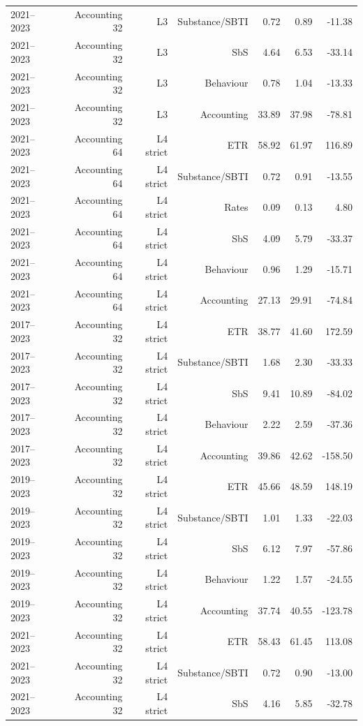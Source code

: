 {\begin{longtable}{@{}lrrrrrr@{}}
2021–2023 & Accounting 32 & L3 & Substance/SBTI &  0.72 &  0.89 &  -11.38 \\
2021–2023 & Accounting 32 & L3 & SbS &  4.64 &  6.53 &  -33.14 \\
2021–2023 & Accounting 32 & L3 & Behaviour &  0.78 &  1.04 &  -13.33 \\
2021–2023 & Accounting 32 & L3 & Accounting & 33.89 & 37.98 &  -78.81 \\
2021–2023 & Accounting 64 & L4 strict & ETR & 58.92 & 61.97 &  116.89 \\
2021–2023 & Accounting 64 & L4 strict & Substance/SBTI &  0.72 &  0.91 &  -13.55 \\
2021–2023 & Accounting 64 & L4 strict & Rates &  0.09 &  0.13 &    4.80 \\
2021–2023 & Accounting 64 & L4 strict & SbS &  4.09 &  5.79 &  -33.37 \\
2021–2023 & Accounting 64 & L4 strict & Behaviour &  0.96 &  1.29 &  -15.71 \\
2021–2023 & Accounting 64 & L4 strict & Accounting & 27.13 & 29.91 &  -74.84 \\
2017–2023 & Accounting 32 & L4 strict & ETR & 38.77 & 41.60 &  172.59 \\
2017–2023 & Accounting 32 & L4 strict & Substance/SBTI &  1.68 &  2.30 &  -33.33 \\
2017–2023 & Accounting 32 & L4 strict & SbS &  9.41 & 10.89 &  -84.02 \\
2017–2023 & Accounting 32 & L4 strict & Behaviour &  2.22 &  2.59 &  -37.36 \\
2017–2023 & Accounting 32 & L4 strict & Accounting & 39.86 & 42.62 & -158.50 \\
2019–2023 & Accounting 32 & L4 strict & ETR & 45.66 & 48.59 &  148.19 \\
2019–2023 & Accounting 32 & L4 strict & Substance/SBTI &  1.01 &  1.33 &  -22.03 \\
2019–2023 & Accounting 32 & L4 strict & SbS &  6.12 &  7.97 &  -57.86 \\
2019–2023 & Accounting 32 & L4 strict & Behaviour &  1.22 &  1.57 &  -24.55 \\
2019–2023 & Accounting 32 & L4 strict & Accounting & 37.74 & 40.55 & -123.78 \\
2021–2023 & Accounting 32 & L4 strict & ETR & 58.43 & 61.45 &  113.08 \\
2021–2023 & Accounting 32 & L4 strict & Substance/SBTI &  0.72 &  0.90 &  -13.00 \\
2021–2023 & Accounting 32 & L4 strict & SbS &  4.16 &  5.85 &  -32.78 \\

\end{longtable}}
